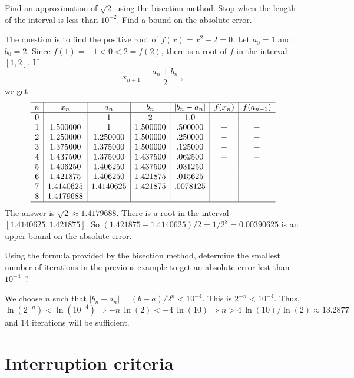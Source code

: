\begin{egg}
Find an approximation of $\sqrt{2}$ using the bisection method.  Stop
when the length of the interval is less than $10^{-2}$.  Find a bound
on the absolute error.

The question is to find the positive root of $f(x) = x^2 -2 = 0$.  Let
$a_0=1$ and $b_0=2$.  Since $f(1) = -1 < 0 < 2 = f(2)$, there is a
root of $f$ in the interval $[1,2]$.  If
\[
x_{n+1}=\frac{a_n+b_n}{2} \ ,
\]
we get
\[
\begin{array}{c|c|c|c|c|c|c}
\hline
 n & x_n & a_n & b_n & |b_n-a_n|  & f(x_n)  &  f(a_{n-1})  \\
\hline
0&  &1 &2 & 1.0 & & \\
1& 1.500000 & 1 & 1.500000 & .500000 & + & - \\
2& 1.250000 & 1.250000 & 1.500000 & .250000 & - & - \\
3& 1.375000 & 1.375000 & 1.500000 & .125000 & - & - \\
4& 1.437500 & 1.375000 & 1.437500 & .062500 & + & - \\
5& 1.406250 & 1.406250 & 1.437500 & .031250 & - & - \\
6& 1.421875 & 1.406250 & 1.421875 & .015625 & + & - \\
7& 1.4140625 & 1.4140625 & 1.421875 & .0078125 & - & - \\
8& 1.4179688 & & & & & \\
\hline
\end{array}
\]
The answer is $\sqrt{2} \approx 1.4179688$.  There is a root in the
interval $[1.4140625,1.421875]$.  So
$(1.421875 - 1.4140625)/2 = 1/2^8 = 0.00390625$ is an upper-bound on the
absolute error.
\label{ExSqrt2}
\end{egg}

\begin{egg}
Using the formula provided by the bisection method, determine the
smallest number of iterations in the previous example to get an
absolute error lest than $10^{-4}$\ ?

We choose $n$ such that $|b_n- a_n| = (b-a)/2^n < 10^{-4}$.  This is
$2^{-n}< 10^{-4}$.  Thus,
\[
  \ln(2^{-n})< \ln(10^{-4}) \Rightarrow 
-n\,\ln(2) < -4\,\ln(10) \Rightarrow n>4\,\ln(10)/\ln(2) \approx
13.2877
\]
and $14$ iterations will be sufficient.
\end{egg}

\section{Interruption criteria}

